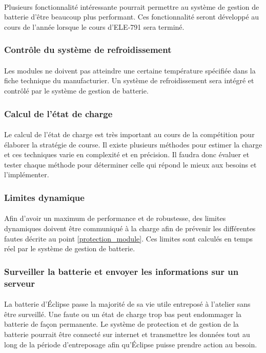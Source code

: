 	\paragraph{}
	Plusieurs fonctionnalité intéressante pourrait permettre au système de gestion de batterie d'être beaucoup plus performant. Ces fonctionnalité seront développé au cours de l'année lorsque le cours d'ELE-791 sera terminé. 
	
	\subsubsection{Contrôle du système de refroidissement}
	\paragraph{}
	Les modules ne doivent pas atteindre une certaine température spécifiée dans la fiche technique du manufacturier. Un système de refroidissement sera intégré et contrôlé par le système de gestion de batterie. 
	
	\subsubsection{Calcul de l'état de charge}
	\paragraph{}
	Le calcul de l'état de charge est très important au cours de la compétition pour élaborer la stratégie de course. Il existe plusieurs méthodes pour estimer la charge et ces techniques varie en complexité et en précision. Il faudra donc évaluer et tester chaque méthode pour déterminer celle qui répond le mieux aux besoins et l'implémenter. 
	
	\subsubsection{Limites dynamique}
	\paragraph{}
	Afin d'avoir un maximum de performance et de robustesse, des limites dynamiques doivent être communiqué à la charge afin de prévenir les différentes fautes décrite au point \ref{protection_module}. Ces limites sont calculés en temps réel par le système de gestion de batterie.
	
	\subsubsection{Surveiller la batterie et envoyer les informations sur un serveur}
	\paragraph{}
	La batterie d'Éclipse passe la majorité de sa vie utile entreposé à l'atelier sans être surveillé. Une faute ou un état de charge trop bas peut endommager la batterie de façon permanente. Le système de protection et de gestion de la batterie pourrait être connecté sur internet et transmettre les données tout au long de la période d'entreposage afin qu'Éclipse puisse prendre action au besoin.  